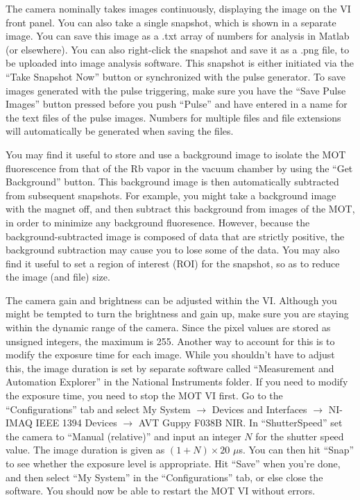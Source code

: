 \documentclass{../lab}
\begin{document}
The camera nominally takes images continuously, displaying the image on the VI front panel. You can also take a single snapshot, which is shown in a separate image. You can save this image as a .txt array of numbers for analysis in Matlab (or elsewhere). You can also right-click the snapshot and save it as a .png file, to be uploaded into image analysis software. This snapshot is either initiated via the ``Take Snapshot Now'' button or synchronized with the pulse generator. To save images generated with the pulse triggering, make sure you have the ``Save Pulse Images'' button pressed before you push ``Pulse'' and have entered in a name for the text files of the pulse images. Numbers for multiple files and file extensions will automatically be generated when saving the files.

You may find it useful to store and use a background image to isolate the MOT fluorescence from that of the Rb vapor in the vacuum chamber by using the ``Get Background'' button. This background image is then automatically subtracted from subsequent snapshots. For example, you might take a background image with the magnet off, and then subtract this background from images of the MOT, in order to minimize any background fluoresence. However, because the background-subtracted image is composed of data that are strictly positive, the background subtraction may cause you to lose some of the data. You may also find it useful to set a region of interest (ROI) for the snapshot, so as to reduce the image (and file) size.

The camera gain and brightness can be adjusted within the VI. Although you might be tempted to turn the brightness and gain up, make sure you are staying within the dynamic range of the camera. Since the pixel values are stored as unsigned integers, the maximum is 255. Another way to account for this is to modify the exposure time for each image. While you shouldn't have to adjust this, the image duration is set by separate software called ``Measurement and Automation Explorer'' in the National Instruments folder. If you need to modify the exposure time, you need to stop the MOT VI first. Go to the ``Configurations'' tab and select My System $\rightarrow$ Devices and Interfaces $\rightarrow$ NI-IMAQ IEEE 1394 Devices $\rightarrow$ AVT Guppy F038B NIR. In ``ShutterSpeed'' set the camera to ``Manual (relative)'' and input an integer $N$ for the shutter speed value. The image duration is given as $(1+N) \times 20$  $\mu$s. You can then hit ``Snap'' to see whether the exposure level is appropriate. Hit ``Save'' when you're done, and then select ``My System'' in the ``Configurations'' tab, or else close the software. You should now be able to restart the MOT VI without errors.
\end{document}
